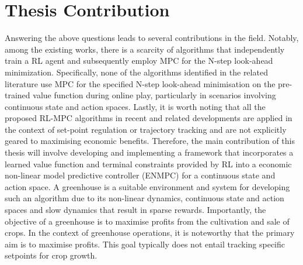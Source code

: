 \section{Thesis Contribution}

Answering the above questions leads to several contributions in the field. Notably, among the existing works, there is a scarcity of algorithms that independently train a RL agent and subsequently employ MPC for the N-step look-ahead minimization. Specifically, none of the algorithms identified in the related literature use MPC for the specified N-step look-ahead minimisation on the pre-trained value function during online play, particularly in scenarios involving continuous state and action spaces. Lastly, it is worth noting that all the proposed RL-MPC algorithms in recent and related developments are applied in the context of set-point regulation or trajectory tracking and are not explicitly geared to maximising economic benefits.
Therefore, the main contribution of this thesis will involve developing and implementing a framework that incorporates a learned value function and terminal constraints provided by RL into a economic non-linear model predictive controller (ENMPC) for a continuous state and action space. A greenhouse is a suitable environment and system for developing such an algorithm due to its non-linear dynamics, continuous state and action spaces and slow dynamics that result in sparse rewards. Importantly, the objective of a greenhouse is to maximise profits from the cultivation and sale of crops. In the context of greenhouse operations, it is noteworthy that the primary aim is to maximise profits. This goal typically does not entail tracking specific setpoints for crop growth.


